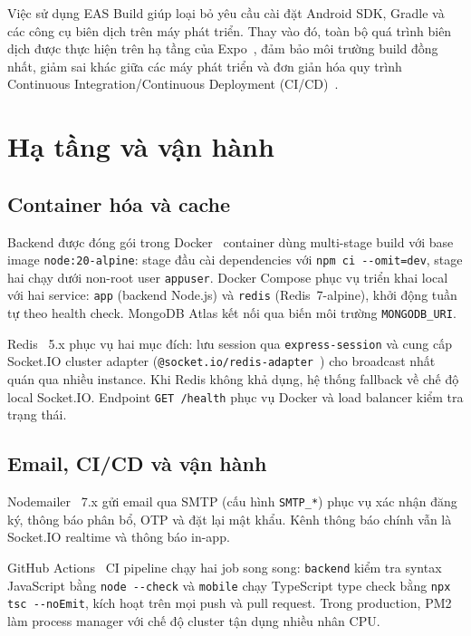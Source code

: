 \documentclass[../DoAn.tex]{subfiles}
\begin{document}
Việc sử dụng EAS Build giúp loại bỏ yêu cầu cài đặt Android SDK, Gradle và
các công cụ biên dịch trên máy phát triển. Thay vào đó, toàn bộ quá trình
biên dịch được thực hiện trên hạ tầng của Expo~\cite{expo_eas_build}, đảm bảo
môi trường build đồng nhất, giảm sai khác giữa các máy phát triển và đơn giản
hóa quy trình Continuous Integration/Continuous Deployment
(CI/CD)~\cite{expo_ci_cd}.
\section{Hạ tầng và vận hành}
\label{sec:infrastructure}

\subsection*{Container hóa và cache}

Backend được đóng gói trong Docker~\cite{docker_docs} container dùng multi-stage
build với base image \texttt{node:20-alpine}: stage đầu cài dependencies với
\texttt{npm ci -{}-omit=dev}, stage hai chạy dưới non-root user \texttt{appuser}.
Docker Compose phục vụ triển khai local với hai service: \texttt{app} (backend
Node.js) và \texttt{redis} (Redis~7-alpine), khởi động tuần tự theo health
check. MongoDB Atlas kết nối qua biến môi trường \texttt{MONGODB\_URI}.

Redis~\cite{redis2024pubsub} 5.x phục vụ hai mục đích: lưu session qua
\texttt{express-session} và cung cấp Socket.IO cluster adapter
(\texttt{@socket.io/redis-adapter}~\cite{socketio2024docs}) cho broadcast nhất
quán qua nhiều instance. Khi Redis không khả dụng, hệ thống fallback về chế
độ local Socket.IO. Endpoint \texttt{GET /health} phục vụ Docker và load
balancer kiểm tra trạng thái.

\subsection*{Email, CI/CD và vận hành}

Nodemailer~\cite{nodemailer_docs} 7.x gửi email qua SMTP (cấu hình
\texttt{SMTP\_*}) phục vụ xác nhận đăng ký, thông báo phân bổ, OTP và đặt
lại mật khẩu. Kênh thông báo chính vẫn là Socket.IO realtime và thông báo
in-app.

GitHub Actions~\cite{github_actions} CI pipeline chạy hai job song song:
\texttt{backend} kiểm tra syntax JavaScript bằng \texttt{node -{}-check} và
\texttt{mobile} chạy TypeScript type check bằng \texttt{npx tsc -{}-noEmit},
kích hoạt trên mọi push và pull request. Trong production, PM2~\cite{pm2_docs}
làm process manager với chế độ cluster tận dụng nhiều nhân CPU.
\end{document}
